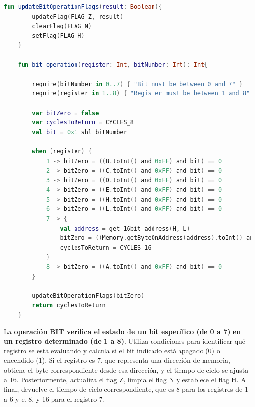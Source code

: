 \begin{lstlisting}[language=Kotlin, caption={Operación BIT}, label={code:kotlinbit}]
    fun updateBitOperationFlags(result: Boolean){
        updateFlag(FLAG_Z, result)
        clearFlag(FLAG_N)
        setFlag(FLAG_H)
    }

    fun bit_operation(register: Int, bitNumber: Int): Int{

        require(bitNumber in 0..7) { "Bit must be between 0 and 7" }
        require(register in 1..8) { "Register must be between 1 and 8" }

        var bitZero = false
        var cyclesToReturn = CYCLES_8
        val bit = 0x1 shl bitNumber

        when (register) {
            1 -> bitZero = ((B.toInt() and 0xFF) and bit) == 0
            2 -> bitZero = ((C.toInt() and 0xFF) and bit) == 0
            3 -> bitZero = ((D.toInt() and 0xFF) and bit) == 0
            4 -> bitZero = ((E.toInt() and 0xFF) and bit) == 0
            5 -> bitZero = ((H.toInt() and 0xFF) and bit) == 0
            6 -> bitZero = ((L.toInt() and 0xFF) and bit) == 0
            7 -> {
                val address = get_16bit_address(H, L)
                bitZero = ((Memory.getByteOnAddress(address).toInt() and 0xFF) and bit) == 0
                cyclesToReturn = CYCLES_16
            }
            8 -> bitZero = ((A.toInt() and 0xFF) and bit) == 0
        }

        updateBitOperationFlags(bitZero)
        return cyclesToReturn
    }
\end{lstlisting}

La \textbf{operación BIT verifica el estado de un bit específico (de 0 a 7) en un registro determinado (de 1 a 8)}. Utiliza condiciones para identificar qué registro se está evaluando y calcula si el bit indicado está apagado (0) o encendido (1). Si el registro es 7, que representa una dirección de memoria, obtiene el byte correspondiente desde esa dirección, y el tiempo de ciclo se ajusta a 16. Posteriormente, actualiza el flag Z, limpia el flag N y establece el flag H. Al final, devuelve el tiempo de ciclo correspondiente, que es 8 para los registros de 1 a 6 y el 8, y 16 para el registro 7.

